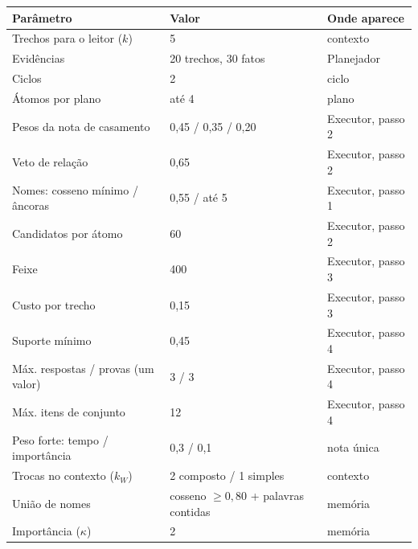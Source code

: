 \documentclass[11pt]{article}
\begin{document}
\begin{center}\small
\begin{tabular}{@{}lll@{}}
\toprule
Parâmetro & Valor & Onde aparece \\
\midrule
Trechos para o leitor ($k$) & 5 & contexto \\
Evidências & 20 trechos, 30 fatos & Planejador \\
Ciclos & 2 & ciclo \\
Átomos por plano & até 4 & plano \\
Pesos da nota de casamento & 0,45 / 0,35 / 0,20 & Executor, passo 2 \\
Veto de relação & 0,65 & Executor, passo 2 \\
Nomes: cosseno mínimo / âncoras & 0,55 / até 5 & Executor, passo 1 \\
Candidatos por átomo & 60 & Executor, passo 2 \\
Feixe & 400 & Executor, passo 3 \\
Custo por trecho & 0,15 & Executor, passo 3 \\
Suporte mínimo & 0,45 & Executor, passo 4 \\
Máx. respostas / provas (um valor) & 3 / 3 & Executor, passo 4 \\
Máx. itens de conjunto & 12 & Executor, passo 4 \\
Peso forte: tempo / importância & 0,3 / 0,1 & nota única \\
Trocas no contexto ($k_W$) & 2 composto / 1 simples & contexto \\
União de nomes & cosseno $\ge0{,}80$ + palavras contidas & memória \\
Importância ($\kappa$) & 2 & memória \\
\bottomrule
\end{tabular}
\end{center}
\end{document}
